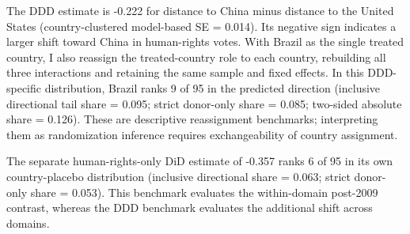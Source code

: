 \documentclass[referee,pdflatex,sn-basic]{sn-jnl}
\renewenvironment{table}[1][]{\tableorg[#1]}{\endtableorg\normalfont}
\theoremstyle{thmstylethree}
\begin{document}
The DDD estimate is -0.222 for distance to China minus distance to the United States (country-clustered model-based SE = 0.014). Its negative sign indicates a larger shift toward China in human-rights votes. With Brazil as the single treated country, I also reassign the treated-country role to each country, rebuilding all three interactions and retaining the same sample and fixed effects. In this DDD-specific distribution, Brazil ranks 9 of 95 in the predicted direction (inclusive directional tail share = 0.095; strict donor-only share = 0.085; two-sided absolute share = 0.126). These are descriptive reassignment benchmarks; interpreting them as randomization inference requires exchangeability of country assignment.

The separate human-rights-only DiD estimate of -0.357 ranks 6 of 95 in its own country-placebo distribution (inclusive directional share = 0.063; strict donor-only share = 0.053). This benchmark evaluates the within-domain post-2009 contrast, whereas the DDD benchmark evaluates the additional shift across domains.

\begin{table}[H]
\centering
\caption{\label{tab:issue-area-prepost-table}Brazil-China identical UNGA votes by issue area, before and after 2009.}
\centering
{}
\end{table}
\end{document}
